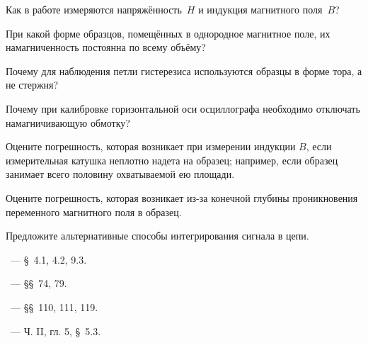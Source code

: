 \begin{lab:questions}

\item Как в работе измеряются напряжённость~$H$ и индукция магнитного поля~$B$?

\item
При какой форме образцов, помещённых в однородное магнитное поле, их
намагниченность постоянна по всему объёму?

\item
Почему для наблюдения петли гистерезиса используются образцы в форме тора,
а не стержня?

\item
Почему при калибровке горизонтальной оси осциллографа необходимо от­ключать
намагничивающую обмотку?

\item
Оцените погрешность, которая возникает при измерении индукции $B$, если
измерительная катушка неплотно надета на образец; например, если образец
занимает всего половину охватываемой ею площади.

\item
Оцените погрешность, которая возникает из-за конечной глубины проникновения
переменного магнитного поля в образец.

\item Предложите альтернативные способы интегрирования сигнала в цепи.

\end{lab:questions}


\begin{lab:literature}
\item \Kirichenko~--- \S~4.1, 4.2, 9.3.

\item \SivuhinIII~--- \S\S~74, 79.

\item \Kalashnikov~--- \S\S~110, 111, 119.

\item \KingLokOlh~--- Ч. II, гл. 5, \S~5.3.
\end{lab:literature}
